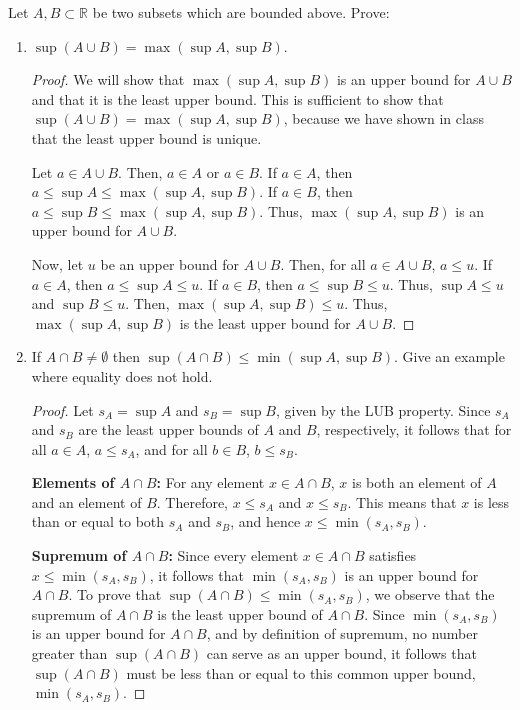 \documentclass[10pt]{article}
\newcommand{\R}{\mathbb{R}}
\newenvironment{problem}[2][Problem]{\begin{trivlist}
\item[\hskip \labelsep {\bfseries #1}\hskip \labelsep {\bfseries #2.}]}{\end{trivlist}}
\begin{document}
\begin{problem}{3}
	Let $ A,B \subset \R $ be two subsets which are bounded above. Prove:
	\begin{enumerate}
		\item $ \sup(A \cup B) = \max(\sup A, \sup B) $.
            \begin{proof}
                We will show that $\max(\sup A, \sup B)$ is an upper bound for $A \cup B$ and that it is the least upper bound. This is sufficient to show that $\sup(A \cup B) = \max(\sup A, \sup B)$, because we have shown in class that the least upper bound is unique.

                Let $a \in A \cup B$. Then, $a \in A$ or $a \in B$. If $a \in A$, then $a \leq \sup A \leq \max(\sup A, \sup B)$. If $a \in B$, then $a \leq \sup B \leq \max(\sup A, \sup B)$. Thus, $\max(\sup A, \sup B)$ is an upper bound for $A \cup B$.

                Now, let $u$ be an upper bound for $A \cup B$. Then, for all $a \in A \cup B$, $a \leq u$. If $a \in A$, then $a \leq \sup A \leq u$. If $a \in B$, then $a \leq \sup B \leq u$.
                Thus, $\sup A \leq u$ and $\sup B \leq u$. Then, $\max(\sup A, \sup B) \leq u$. Thus, $\max(\sup A, \sup B)$ is the least upper bound for $A \cup B$.
                
            \end{proof}
		\item If $ A \cap B \neq \emptyset $ then $ \sup(A \cap B) \leq \min(\sup A, \sup B) $. Give an example where equality does not hold.
            \begin{proof}
                Let $s_A = \sup A$ and $s_B = \sup B$, given by the LUB property.
                Since $s_A$ and $s_B$ are the least upper bounds of $A$ and $B$, respectively, it follows that for all $a \in A$, $a \leq s_A$, and for all $b \in B$, $b \leq s_B$.
                
                \textbf{Elements of $A \cap B$:} For any element $x \in A \cap B$, $x$ is both an element of $A$ and an element of $B$. Therefore, $x \leq s_A$ and $x \leq s_B$. This means that $x$ is less than or equal to both $s_A$ and $s_B$, and hence $x \leq \min(s_A, s_B)$.
                
                \textbf{Supremum of $A \cap B$:} Since every element $x \in A \cap B$ satisfies $x \leq \min(s_A, s_B)$, it follows that $\min(s_A, s_B)$ is an upper bound for $A \cap B$. To prove that $\sup(A \cap B) \leq \min(s_A, s_B)$, we observe that the supremum of $A \cap B$ is the least upper bound of $A \cap B$. Since $\min(s_A, s_B)$ is an upper bound for $A \cap B$, and by definition of supremum, no number greater than $\sup(A \cap B)$ can serve as an upper bound, it follows that $\sup(A \cap B)$ must be less than or equal to this common upper bound, $\min(s_A, s_B)$.


\end{proof}
\end{enumerate}
\end{problem}
\end{document}
